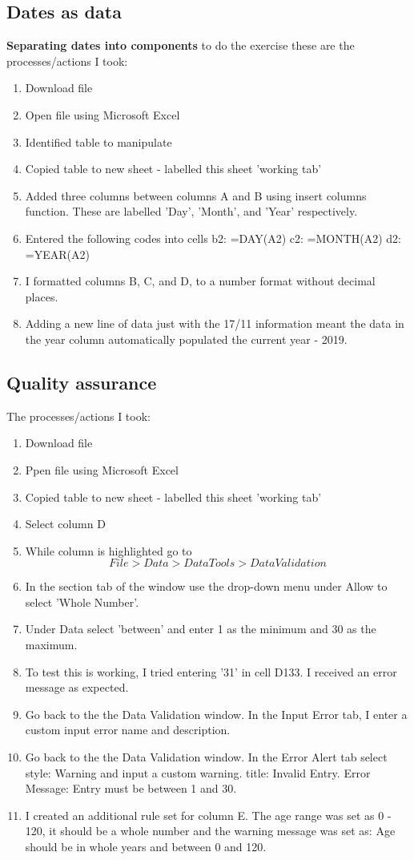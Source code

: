 \documentclass{article}
\begin{document}
\subsection{Dates as data}
\textbf{Separating dates into components}
to do the exercise these are the processes/actions I took:
\begin{enumerate}
    \item Download file
    \item Open file using Microsoft Excel
    \item Identified table to manipulate
    \item Copied table to new sheet - labelled this sheet 'working tab'
    \item Added three columns between columns A and B using insert columns function. These are labelled 'Day', 'Month', and 'Year' respectively.
    \item Entered the following codes into cells b2: =DAY(A2) c2: =MONTH(A2) d2: =YEAR(A2)
    \item I formatted columns B, C, and D, to a number format without decimal places. 
    \item Adding a new line of data just with the 17/11 information meant the data in the year column automatically populated the current year - 2019. 
\end{enumerate}

\subsection{Quality assurance}
The processes/actions I took:
\begin{enumerate}
    \item Download file
    \item Ppen file using Microsoft Excel
    \item Copied table to new sheet - labelled this sheet 'working tab'
    \item Select column D
    \item While column is highlighted go to \[File> Data> Data Tools> Data Validation\]
    \item In the section tab of the window use the drop-down menu under Allow to select 'Whole Number'.
    \item Under Data select 'between' and enter 1 as the minimum and 30 as the maximum. 
    \item To test this is working, I tried entering '31' in cell D133. I received an error message as expected. 
    \item Go back to the the Data Validation window. In the Input Error tab, I enter a custom input error name and description.
    \item Go back to the the Data Validation window. In the Error Alert tab select style: Warning and input a custom warning. title: Invalid Entry. Error Message: Entry must be between 1 and 30.
    \item I created an additional rule set for column E. The age range was set as 0 - 120, it should be a whole number and the warning message was set as: Age should be in whole years and between 0 and 120.
\end{enumerate}
\end{document}
